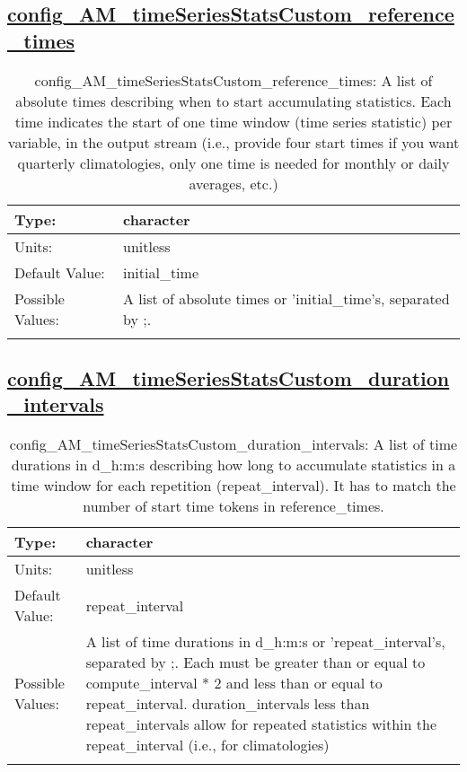 \subsection[config\_AM\_timeSeriesStatsCustom\_reference\_times]{\hyperref[sec:nm_tab_AM_timeSeriesStatsCustom]{config\_AM\_timeSeriesStatsCustom\_reference\_times}}
\label{subsec:nm_sec_config_AM_timeSeriesStatsCustom_reference_times}
\begin{center}
\begin{longtable}{| p{2.0in} || p{4.0in} |}
    \hline
    Type: & character \\
    \hline
    Units: & \si{unitless} \\
    \hline
    Default Value: & initial\_time \\
    \hline
    Possible Values: & A list of absolute times or 'initial\_time's, separated by ;. \\
    \hline
    \caption{config\_AM\_timeSeriesStatsCustom\_reference\_times: A list of absolute times describing when to start accumulating statistics. Each time indicates the start of one time window (time series statistic) per variable, in the output stream (i.e., provide four start times if you want quarterly climatologies, only one time is needed for monthly or daily averages, etc.)}
\end{longtable}
\end{center}
\subsection[config\_AM\_timeSeriesStatsCustom\_duration\_intervals]{\hyperref[sec:nm_tab_AM_timeSeriesStatsCustom]{config\_AM\_timeSeriesStatsCustom\_duration\_intervals}}
\label{subsec:nm_sec_config_AM_timeSeriesStatsCustom_duration_intervals}
\begin{center}
\begin{longtable}{| p{2.0in} || p{4.0in} |}
    \hline
    Type: & character \\
    \hline
    Units: & \si{unitless} \\
    \hline
    Default Value: & repeat\_interval \\
    \hline
    Possible Values: & A list of time durations in d\_h:m:s or 'repeat\_interval's, separated by ;. Each must be greater than or equal to compute\_interval * 2 and less than or equal to repeat\_interval. duration\_intervals less than repeat\_intervals allow for repeated statistics within the repeat\_interval (i.e., for climatologies) \\
    \hline
    \caption{config\_AM\_timeSeriesStatsCustom\_duration\_intervals: A list of time durations in d\_h:m:s describing how long to accumulate statistics in a time window for each repetition (repeat\_interval). It has to match the number of start time tokens in reference\_times.}
\end{longtable}
\end{center}
